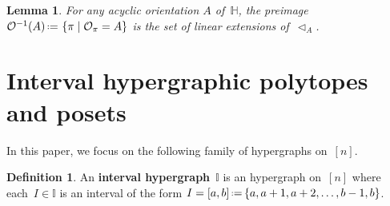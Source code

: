 \documentclass[reqno]{amsart}
\newtheorem{lemma}[theorem]{Lemma}
\theoremstyle{definition}
\newtheorem{definition}[theorem]{Definition}
\newcommand{\set}[2]{\left\{ #1 \;\middle|\; #2 \right\}} %
\newcommand{\eqdef}{\mbox{\,\raisebox{0.2ex}{\scriptsize\ensuremath{\mathrm:}}\ensuremath{=}\,}} %
\newcommand{\defn}[1]{\textbf{\textsf{\color{PineGreen} #1}}} %
\newcommand{\less}{\vartriangleleft} %
\newcommand{\Or}{\mathcal O}  %
\newcommand{\HH}{\mathbb H}  %
\newcommand{\II}{\mathbb I} %
\begin{document}
\begin{lemma}
\label{lem:prepi}
For any acyclic orientation $A$ of~$\HH$, the preimage $\Or^{-1}(A) \eqdef \set{\pi}{\Or_\pi=A}$ is the set of linear extensions of~$\less_A$.
\end{lemma}




\section{Interval hypergraphic polytopes and posets}
\label{sec:IHP}

In this paper, we focus on the following family of hypergraphs on~$[n]$.

\begin{definition}
An \defn{interval hypergraph}~$\II$ is an hypergraph on~$[n]$ where each~$I \in \II$ is an interval of the form $I = [a,b] \eqdef \{a, a+1, a+2, \dots, b-1, b\}$.
\end{definition}
\end{document}

